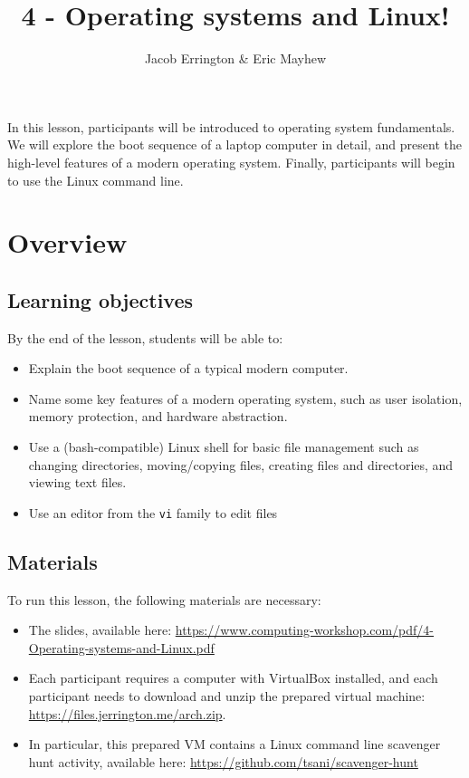 \documentclass[11pt]{article}
\title{4 - Operating systems and Linux!}
\author{Jacob Errington \& Eric Mayhew}
\date{}
\newcommand{\cwurl}{https://www.computing-workshop.com/}
\newcommand{\cwpdf}{\cwurl pdf/}
\begin{document}
\maketitle

In this lesson, participants will be introduced to operating system
fundamentals. We will explore the boot sequence of a laptop computer in detail,
and present the high-level features of a modern operating system.
Finally, participants will begin to use the Linux command line.

\section*{Overview}

\subsection*{Learning objectives}

By the end of the lesson, students will be able to:
\begin{itemize}
\item
  Explain the boot sequence of a typical modern computer.
\item
  Name some key features of a modern operating system, such as user isolation,
  memory protection, and hardware abstraction.
\item
  Use a (bash-compatible) Linux shell for basic file management such as changing
  directories, moving/copying files, creating files and directories, and viewing
  text files.
\item
  Use an editor from the \texttt{vi} family to edit files
\end{itemize}

\subsection*{Materials}

To run this lesson, the following materials are necessary:

\begin{itemize}
\item
  The slides, available here:
  \url{\cwpdf 4-Operating-systems-and-Linux.pdf}
\item
  Each participant requires a computer with VirtualBox installed, and each
  participant needs to download and unzip the prepared virtual machine:
  \url{https://files.jerrington.me/arch.zip}.

\item
  In particular, this prepared VM contains a Linux command line scavenger hunt
  activity, available here:
  \url{https://github.com/tsani/scavenger-hunt}
\end{itemize}
\end{document}
